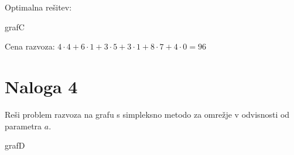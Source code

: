 \documentclass[14pt]{extarticle}
\begin{document}
Optimalna rešitev:

\begin{razvoz}[scale=0.9]{grafC}

\end{razvoz}

Cena razvoza: $4 \cdot 4 + 6 \cdot 1 + 3 \cdot 5 + 3 \cdot 1 + 8 \cdot 7 + 4 \cdot 0 = 96$

\clearpage
\section*{Naloga 4}

Reši problem razvoza na grafu s simpleksno metodo za omrežje
v odvisnosti od parametra $a$.

\begin{razvoz}{grafD}
\end{razvoz}
\end{document}
